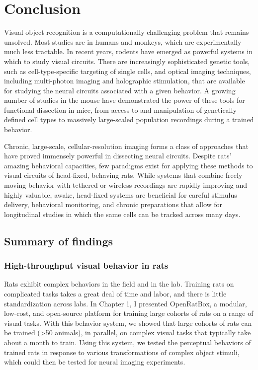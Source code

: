 \chapter{Conclusion}
\label{conclusion}
Visual object recognition is a computationally challenging problem that remains unsolved. Most studies are in humans and monkeys, which are experimentally much less tractable. In recent years, rodents have emerged as powerful systems in which to study visual circuits. There are increasingly sophisticated genetic tools, such as cell-type-specific targeting of single cells, and optical imaging techniques, including multi-photon imaging and  holographic stimulation, that are available for studying the neural circuits associated with a given behavior. A growing number of studies in the mouse have demonstrated the power of these tools for functional dissection in mice, from access to and manipulation of genetically-defined cell types to massively large-scaled population recordings during a trained behavior.

Chronic, large-scale, cellular-resolution imaging forms a class of approaches that have proved immensely powerful in dissecting neural circuits. Despite rats’ amazing behavioral capacities, few paradigms exist for applying these methods to visual circuits of head-fixed, behaving rats. While systems that combine freely moving behavior with tethered or wireless recordings are rapidly improving and highly valuable, awake, head-fixed systems are beneficial for careful stimulus delivery, behavioral monitoring, and chronic preparations that allow for longitudinal studies in which the same cells can be tracked across many days.   

\section{Summary of findings} 
\subsection{High-throughput visual behavior in rats}
Rats exhibit complex behaviors in the field and in the lab. Training rats on complicated tasks takes a great deal of time and labor, and there is little standardization across labs. In Chapter 1, I presented OpenRatBox, a modular, low-cost, and open-source platform for training large cohorts of rats on a range of visual tasks. With this behavior system, we showed that large cohorts of rats can be trained (>50 animals), in parallel, on complex visual tasks that typically take about a month to train. Using this system, we tested the perceptual behaviors of trained rats in response to various transformations of complex object stimuli, which could then be tested for neural imaging experiments. 

